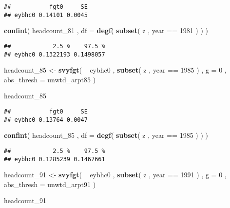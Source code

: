 \documentclass[]{book}
\newenvironment{Shaded}{\begin{snugshade}}{\end{snugshade}}
\newcommand{\KeywordTok}[1]{\textcolor[rgb]{0.13,0.29,0.53}{\textbf{{#1}}}}
\newcommand{\DataTypeTok}[1]{\textcolor[rgb]{0.13,0.29,0.53}{{#1}}}
\newcommand{\DecValTok}[1]{\textcolor[rgb]{0.00,0.00,0.81}{{#1}}}
\newcommand{\StringTok}[1]{\textcolor[rgb]{0.31,0.60,0.02}{{#1}}}
\newcommand{\NormalTok}[1]{{#1}}
\theoremstyle{definition}
\theoremstyle{definition}
\theoremstyle{remark}
\begin{document}
\begin{verbatim}
##           fgt0     SE
## eybhc0 0.14101 0.0045
\end{verbatim}

\begin{Shaded}
\begin{Highlighting}[]
\KeywordTok{confint}\NormalTok{( headcount_81 , }\DataTypeTok{df =} \KeywordTok{degf}\NormalTok{( }\KeywordTok{subset}\NormalTok{( z , year ==}\StringTok{ }\DecValTok{1981} \NormalTok{) ) )}
\end{Highlighting}
\end{Shaded}

\begin{verbatim}
##            2.5 %    97.5 %
## eybhc0 0.1322193 0.1498057
\end{verbatim}

\begin{Shaded}
\begin{Highlighting}[]
\NormalTok{headcount_85 <-}\StringTok{ }
\StringTok{    }\KeywordTok{svyfgt}\NormalTok{( }
        \NormalTok{~}\StringTok{ }\NormalTok{eybhc0 , }
        \KeywordTok{subset}\NormalTok{( z , year ==}\StringTok{ }\DecValTok{1985} \NormalTok{) , }
        \DataTypeTok{g =} \DecValTok{0} \NormalTok{, }
        \DataTypeTok{abs_thresh =} \NormalTok{unwtd_arpt85 }
    \NormalTok{)}
    
\NormalTok{headcount_85}
\end{Highlighting}
\end{Shaded}

\begin{verbatim}
##           fgt0     SE
## eybhc0 0.13764 0.0047
\end{verbatim}

\begin{Shaded}
\begin{Highlighting}[]
\KeywordTok{confint}\NormalTok{( headcount_85 , }\DataTypeTok{df =} \KeywordTok{degf}\NormalTok{( }\KeywordTok{subset}\NormalTok{( z , year ==}\StringTok{ }\DecValTok{1985} \NormalTok{) ) )}
\end{Highlighting}
\end{Shaded}

\begin{verbatim}
##            2.5 %    97.5 %
## eybhc0 0.1285239 0.1467661
\end{verbatim}

\begin{Shaded}
\begin{Highlighting}[]
\NormalTok{headcount_91 <-}\StringTok{ }
\StringTok{    }\KeywordTok{svyfgt}\NormalTok{( }
        \NormalTok{~}\StringTok{ }\NormalTok{eybhc0 , }
        \KeywordTok{subset}\NormalTok{( z , year ==}\StringTok{ }\DecValTok{1991} \NormalTok{) , }
        \DataTypeTok{g =} \DecValTok{0} \NormalTok{, }
        \DataTypeTok{abs_thresh =} \NormalTok{unwtd_arpt91 }
    \NormalTok{)}

\NormalTok{headcount_91}
\end{Highlighting}
\end{Shaded}
\end{document}
